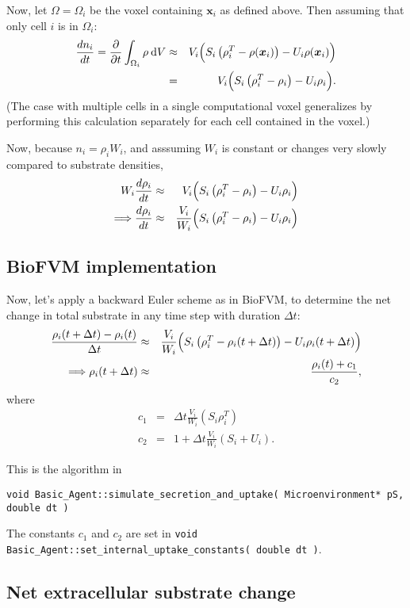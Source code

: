 \documentclass[11point]{article}
\newcommand{\beq}{\begin{eqnarray}}
\newcommand{\eeq}{\end{eqnarray}}
\renewcommand{\d}[1]{\:\mathrm{d}#1}
\renewcommand{\vec}[1]{\bm{#1}}
\begin{document}
Now, let $\Omega = \Omega_i$ be the voxel containing $\vec{x}_i$ as 
defined above. Then assuming that only cell $i$ is in $\Omega_i$:  \beq
\frac{ d{n_i} }{ d{t} }  
= 
\frac{ \partial }{ \partial t} 
\int_{\Omega_i} \rho \d{V}
 & \approx &  
V_i 
\Bigl(  S_i \left( \rho^T_i - \rho(\vec{x}_i) \right)  - U_i \rho(\vec{x}_i)   \Bigr)  \\
& = & 
V_i 
\Bigl(  S_i \left( \rho^T_i - \rho_i \right)  - U_i \rho_i   \Bigr) .
\eeq 
(The case with multiple cells in a single computational voxel generalizes by performing this calculation separately for each cell contained in the voxel.)

Now, because $n_i = \rho_i W_i $, and asssuming $W_i$ is constant or changes very slowly compared to substrate densities, 
\beq
W_i \frac{ d{\rho_i} }{ d{t} }  & \approx &  
V_i 
\Bigl(  S_i \left( \rho^T_i - \rho_i \right)  - U_i \rho_i   \Bigr)   \\
\Longrightarrow 
\frac{d\rho_i }{dt} & \approx & 
\frac{ V_i }{W_i }
\Bigl( S_i \left( \rho_i^T - \rho_i \right) - U_i \rho_i \Bigr) 
\eeq 

\subsection{BioFVM implementation}
Now, let's apply a backward Euler scheme as in BioFVM, to determine the net change in total substrate in any time step with duration $\Delta t$: 
\beq
\frac{ \rho_i(t+\Delta t) - \rho_i(t)}{\Delta t} 
& \approx & 
\frac{ V_i }{W_i } 
\Bigl( S_i \left( \rho_i^T - \rho_i(t+\Delta t) \right) 
- U_i \rho_i( t + \Delta t ) \Bigr)\\
\Longrightarrow 
\rho_i( t+\Delta t) 
& \approx & 
\frac{\rho_i(t)  + c_1 }{c_2},
\eeq
where 
\beq
c_1 & = & \Delta t \frac{ V_i }{W_i } 
\left( S_i \rho_i^T \right) \\ 
c_2 & = & 1 + \Delta t \frac{ V_i }{W_i } 
\left( S_i + U_i \right) .
\eeq

This is the algorithm in 

\begin{center}\verb|void Basic_Agent::simulate_secretion_and_uptake( Microenvironment* pS, double dt )|
\end{center}

The constants $c_1$ and $c_2$ are set in 
\verb|void Basic_Agent::set_internal_uptake_constants( double dt )|. 

\subsection{Net extracellular substrate change}
\end{document}
